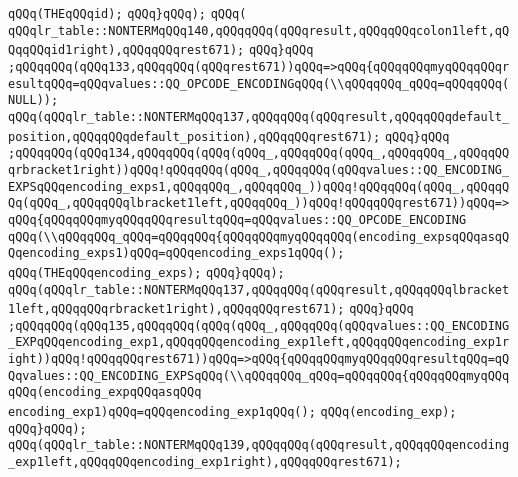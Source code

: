 \verb|qQQq(THEqQQqid);|\newline
\verb|qQQq}qQQq);|\newline
\verb|qQQq(|\newline
\verb|qQQqlr_table::NONTERMqQQq140,qQQqqQQq(qQQqresult,qQQqqQQqcolon1left,qQQqqQQqid1right),qQQqqQQqrest671);|\newline
\verb|qQQq}qQQq|\newline
\verb|;qQQqqQQq(qQQq133,qQQqqQQq(qQQqrest671))qQQq=>qQQq{qQQqqQQqmyqQQqqQQqresultqQQq=qQQqvalues::QQ_OPCODE_ENCODINGqQQq(\\qQQqqQQq_qQQq=qQQqqQQq(NULL));|\newline
\verb|qQQq(qQQqlr_table::NONTERMqQQq137,qQQqqQQq(qQQqresult,qQQqqQQqdefault_position,qQQqqQQqdefault_position),qQQqqQQqrest671);|\newline
\verb|qQQq}qQQq|\newline
\verb|;qQQqqQQq(qQQq134,qQQqqQQq(qQQq(qQQq_,qQQqqQQq(qQQq_,qQQqqQQq_,qQQqqQQqrbracket1right))qQQq!qQQqqQQq(qQQq_,qQQqqQQq(qQQqvalues::QQ_ENCODING_EXPSqQQqencoding_exps1,qQQqqQQq_,qQQqqQQq_))qQQq!qQQqqQQq(qQQq_,qQQqqQQq(qQQq_,qQQqqQQqlbracket1left,qQQqqQQq_))qQQq!qQQqqQQqrest671))qQQq=>qQQq{qQQqqQQqmyqQQqqQQqresultqQQq=qQQqvalues::QQ_OPCODE_ENCODING|\newline
\verb|qQQq(\\qQQqqQQq_qQQq=qQQqqQQq{qQQqqQQqmyqQQqqQQq(encoding_expsqQQqasqQQqencoding_exps1)qQQq=qQQqencoding_exps1qQQq();|\newline
\verb|qQQq(THEqQQqencoding_exps);|\newline
\verb|qQQq}qQQq);|\newline
\verb|qQQq(qQQqlr_table::NONTERMqQQq137,qQQqqQQq(qQQqresult,qQQqqQQqlbracket1left,qQQqqQQqrbracket1right),qQQqqQQqrest671);|\newline
\verb|qQQq}qQQq|\newline
\verb|;qQQqqQQq(qQQq135,qQQqqQQq(qQQq(qQQq_,qQQqqQQq(qQQqvalues::QQ_ENCODING_EXPqQQqencoding_exp1,qQQqqQQqencoding_exp1left,qQQqqQQqencoding_exp1right))qQQq!qQQqqQQqrest671))qQQq=>qQQq{qQQqqQQqmyqQQqqQQqresultqQQq=qQQqvalues::QQ_ENCODING_EXPSqQQq(\\qQQqqQQq_qQQq=qQQqqQQq{qQQqqQQqmyqQQqqQQq(encoding_expqQQqasqQQq|\newline
\verb|encoding_exp1)qQQq=qQQqencoding_exp1qQQq();|\newline
\verb|qQQq(encoding_exp);|\newline
\verb|qQQq}qQQq);|\newline
\verb|qQQq(qQQqlr_table::NONTERMqQQq139,qQQqqQQq(qQQqresult,qQQqqQQqencoding_exp1left,qQQqqQQqencoding_exp1right),qQQqqQQqrest671);|\newline

